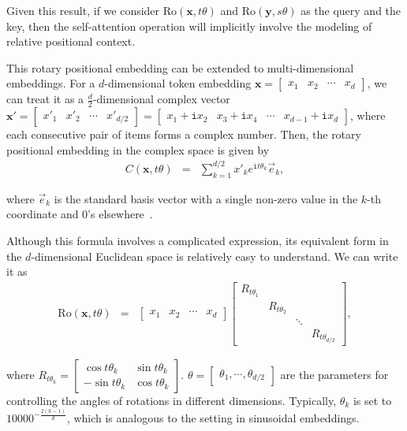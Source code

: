 \noindent Given this result, if we consider $\mathrm{Ro}(\mathbf{x},t\theta)$ and $\mathrm{Ro}(\mathbf{y},s\theta)$ as the query and the key, then the self-attention operation will implicitly involve the modeling of relative positional context.

This rotary positional embedding can be extended to multi-dimensional embeddings. For a $d$-dimensional token embedding $\mathbf{x} = \begin{bmatrix} x_1 & x_2 & \cdots & x_d \end{bmatrix}$, we can treat it as a $\frac{d}{2}$-dimensional complex vector $\mathbf{x}' = \begin{bmatrix} x'_1 & x'_2 & \cdots & x'_{d/2} \end{bmatrix} = \begin{bmatrix} x_1 + \mathtt{i} x_2 & x_3 + \mathtt{i} x_4 & \cdots & x_{d-1} + \mathtt{i} x_d \end{bmatrix}$, where each consecutive pair of items forms a complex number. Then, the rotary positional embedding in the complex space is given by
\begin{eqnarray}
C(\mathbf{x},t\theta) & = & \sum_{k=1}^{d/2} x'_k e^{\mathtt{i} t\theta_k} \vec{e}_k,
\end{eqnarray}

\noindent where $\vec{e}_k$ is the standard basis vector with a single non-zero value in the $k$-th coordinate and 0's elsewhere~\cite{biderman-etal:2021rotary}.

Although this formula involves a complicated expression, its equivalent form in the $d$-dimensional Euclidean space is relatively easy to understand. We can write it as
\begin{eqnarray}
\mathrm{Ro}(\mathbf{x},t\theta) & = & \begin{bmatrix} x_1 & x_2 & \cdots & x_d \end{bmatrix}
                                      \begin{bmatrix} R_{t\theta_1} & & & \\ & R_{t\theta_2} & & \\ & & \ddots & \\ & & & R_{t\theta_{d/2}} \end{bmatrix} \label{eq:rope-base},
\end{eqnarray}

\noindent where $R_{t \theta_k} = \begin{bmatrix} \cos t \theta_k & \sin t \theta_k \\ -\sin t \theta_k & \cos t \theta_k \end{bmatrix}$. $\theta = \begin{bmatrix} \theta_1, \cdots, \theta_{d/2}\end{bmatrix}$ are the parameters for controlling the angles of rotations in different dimensions. Typically, $\theta_k$ is set to $10000^{-\frac{2(k-1)}{d}}$, which is analogous to the setting in sinusoidal embeddings.

